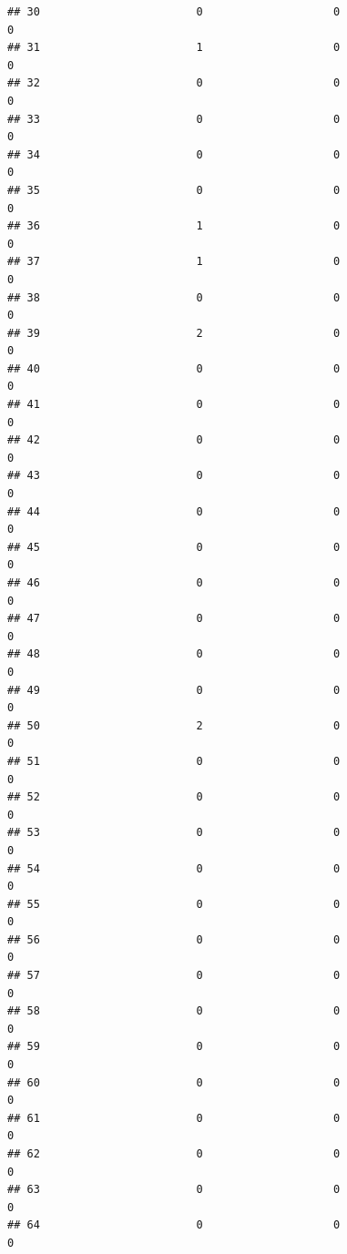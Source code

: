 \documentclass[
]{article}
\begin{document}
\begin{verbatim}
## 30                        0                    0                      0
## 31                        1                    0                      0
## 32                        0                    0                      0
## 33                        0                    0                      0
## 34                        0                    0                      0
## 35                        0                    0                      0
## 36                        1                    0                      0
## 37                        1                    0                      0
## 38                        0                    0                      0
## 39                        2                    0                      0
## 40                        0                    0                      0
## 41                        0                    0                      0
## 42                        0                    0                      0
## 43                        0                    0                      0
## 44                        0                    0                      0
## 45                        0                    0                      0
## 46                        0                    0                      0
## 47                        0                    0                      0
## 48                        0                    0                      0
## 49                        0                    0                      0
## 50                        2                    0                      0
## 51                        0                    0                      0
## 52                        0                    0                      0
## 53                        0                    0                      0
## 54                        0                    0                      0
## 55                        0                    0                      0
## 56                        0                    0                      0
## 57                        0                    0                      0
## 58                        0                    0                      0
## 59                        0                    0                      0
## 60                        0                    0                      0
## 61                        0                    0                      0
## 62                        0                    0                      0
## 63                        0                    0                      0
## 64                        0                    0                      0

\end{verbatim}
\end{document}
